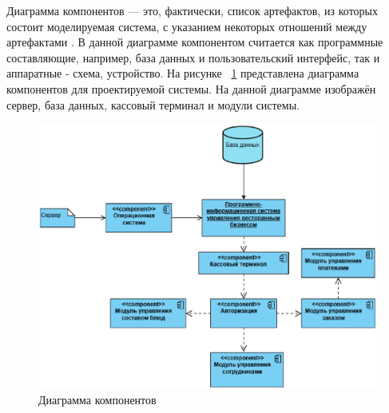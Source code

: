 Диаграмма компонентов — это, фактически, список артефактов, из которых состоит моделируемая система, с указанием некоторых отношений между артефактами \cite{components}.
В данной диаграмме компонентом считается как программные составляющие, например, база данных и пользовательский интерфейс, так и аппаратные - схема, устройство. На рисунке  ~\ref{componetdiag:image} представлена диаграмма компонентов для проектируемой системы. На данной диаграмме изображён сервер, база данных, кассовый терминал и модули системы.
\begin{figure}[ht]
\centering
\includegraphics[width=1\linewidth]{componetdiag}
\caption{Диаграмма компонентов}
\label{componetdiag:image}
\end{figure}


